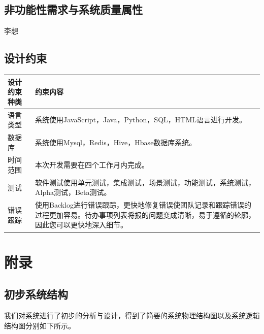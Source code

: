\documentclass{ctexrep}
\begin{document}
\section{非功能性需求与系统质量属性}
李想
\section{设计约束}
\begin{longtable}{p{2cm}|p{10cm}}
	\hline
	设计约束种类 & 约束内容 \\
	\hline
	\hline
	语言类型& 系统使用JavaScript，Java，Python，SQL，HTML语言进行开发。\\
	\hline
	数据库 & 系统使用Mysql，Redis，Hive，Hbase数据库系统。 \\
	\hline
	时间范围 & 本次开发需要在四个工作月内完成。\\
	\hline
	测试 & 软件测试使用单元测试，集成测试，场景测试，功能测试，系统测试，Alpha测试，Beta测试。\\
	\hline
	错误跟踪 & 使用Backlog进行错误跟踪，更快地修复错误使团队记录和跟踪错误的过程更加容易。待办事项列表将报的问题变成清晰，易于遵循的轮廓，因此您可以更快地深入细节。\\
	\hline
	\end{longtable}
\chapter{附录}
\section{初步系统结构}
我们对系统进行了初步的分析与设计，得到了简要的系统物理结构图以及系统逻辑结构图分别如下所示。
\end{document}
